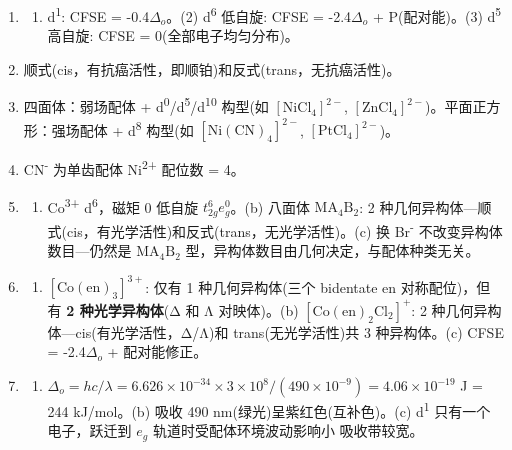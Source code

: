 \begin{enumerate}
\begin{enumerate}
  \end{enumerate}
\item
  \begin{enumerate}
  \def\labelenumii{(\arabic{enumii})}
  \tightlist
  \item
    d\textsuperscript{1}: CFSE = -0.4\(\Delta_o\)。(2) d\textsuperscript{6} 低自旋: CFSE = -2.4\(\Delta_o\) + P(配对能)。(3) d\textsuperscript{5} 高自旋: CFSE = 0(全部电子均匀分布)。
  \end{enumerate}
\item
  顺式(cis，有抗癌活性，即顺铂)和反式(trans，无抗癌活性)。
\item
  四面体：弱场配体 + d\textsuperscript{0}/d\textsuperscript{5}/d\textsuperscript{10} 构型(如 \(\mathrm{[NiCl_4]^{2-}}\), \(\mathrm{[ZnCl_4]^{2-}}\))。平面正方形：强场配体 + d\textsuperscript{8} 构型(如 \(\mathrm{[Ni(CN)_4]^{2-}}\), \(\mathrm{[PtCl_4]^{2-}}\))。
\item
  CN\textsuperscript{-} 为单齿配体 \箭 Ni\textsuperscript{2+} 配位数 = 4。
\item
  \begin{enumerate}
  \def\labelenumii{(\alph{enumii})}
  \tightlist
  \item
    Co\textsuperscript{3+} d\textsuperscript{6}，磁矩 0 \箭 低自旋 \(t_{2g}^6 e_g^0\)。(b) 八面体 \(\mathrm{MA_4B_2}\): 2 种几何异构体---顺式(cis，有光学活性)和反式(trans，无光学活性)。(c) 换 Br\textsuperscript{-} 不改变异构体数目---仍然是 \(\mathrm{MA_4B_2}\) 型，异构体数目由几何决定，与配体种类无关。
  \end{enumerate}
\item
  \begin{enumerate}
  \def\labelenumii{(\alph{enumii})}
  \tightlist
  \item
    \(\mathrm{[Co(en)_3]^{3+}}\): 仅有 1 种几何异构体(三个 bidentate en 对称配位)，但有 \textbf{2 种光学异构体}(Δ 和 Λ 对映体)。(b) \(\mathrm{[Co(en)_2Cl_2]^+}\): 2 种几何异构体---cis(有光学活性，Δ/Λ)和 trans(无光学活性)\箭 共 3 种异构体。(c) CFSE = -2.4\(\Delta_o\) + 配对能修正。
  \end{enumerate}
\item
  \begin{enumerate}
  \def\labelenumii{(\alph{enumii})}
  \tightlist
  \item
    \(\Delta_o = hc/\lambda = 6.626\times10^{-34}\times3\times10^8/(490\times10^{-9}) = 4.06\times10^{-19}\) J = 244 kJ/mol。(b) 吸收 490 nm(绿光)\箭 呈紫红色(互补色)。(c) d\textsuperscript{1} 只有一个电子，跃迁到 \(e_g\) 轨道时受配体环境波动影响小 \箭 吸收带较宽。

\end{enumerate}
\end{enumerate}
